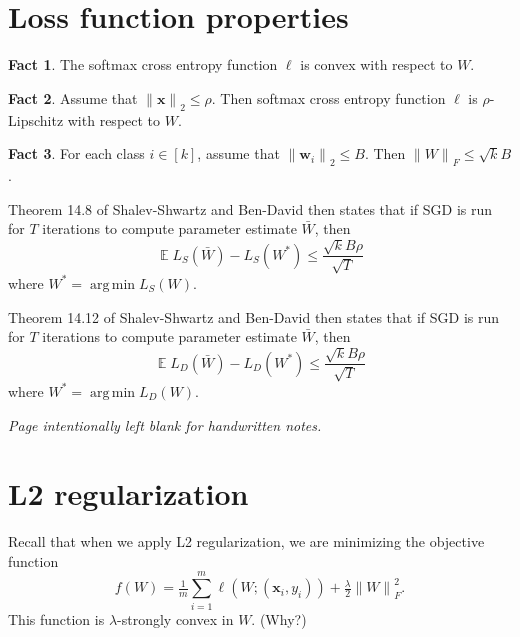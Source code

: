 \documentclass[10pt]{article}
\theoremstyle{definition}
\newtheorem{fact}{Fact}
\DeclareMathOperator{\E}{\mathbb E}
\DeclareMathOperator*{\argmin}{arg\,min}
\newcommand{\loss}{\ell}
\newcommand{\w}{\mathbf w}
\newcommand{\x}{\mathbf x}
\newcommand{\ltwo}[1]{{\lVert {#1} \rVert}_2}
\newcommand{\lF}[1]{{\lVert {#1} \rVert}_F}
\begin{document}
\section{Loss function properties}

\begin{fact}
    The softmax cross entropy function $\loss$ is convex with respect to $W$.
\end{fact}

\begin{fact}
    Assume that $\ltwo{\x}\le \rho$.
    Then softmax cross entropy function $\loss$ is $\rho$-Lipschitz with respect to $W$.
\end{fact}

\begin{fact}
    For each class $i \in [k]$, assume that $\ltwo{\w_i} \le B$.
    Then $\lF{W} \le \sqrt kB$.
\end{fact}

\noindent
Theorem 14.8 of Shalev-Shwartz and Ben-David then states that if SGD is run for $T$ iterations to compute parameter estimate $\bar W$,
then
\begin{equation}
    \E L_S(\bar W) - L_S(W^*) \le \frac {\sqrt kB\rho}{\sqrt T}
\end{equation}
where $W^* = \argmin L_S(W)$.

Theorem 14.12 of Shalev-Shwartz and Ben-David then states that if SGD is run for $T$ iterations to compute parameter estimate $\bar W$,
then
\begin{equation}
    \E L_D(\bar W) - L_D(W^*) \le \frac {\sqrt kB\rho}{\sqrt T}
\end{equation}
where $W^* = \argmin L_D(W)$.

\newpage
\noindent\emph{Page intentionally left blank for handwritten notes.}
\newpage
\section{L2 regularization}

Recall that when we apply L2 regularization,
we are minimizing the objective function
\begin{equation}
    f(W) = \tfrac 1 m \sum_{i=1}^m \loss(W; (\x_i,y_i)) + \tfrac\lambda2\lF{W}^2
    .
\end{equation}
This function is $\lambda$-strongly convex in $W$.
(Why?)
\end{document}
